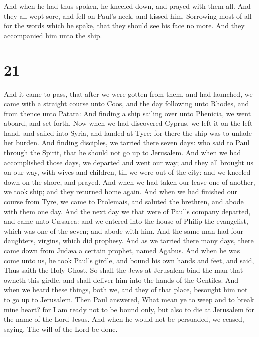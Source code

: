  And when he had thus spoken, he kneeled down, and prayed
with them all.  And they all wept sore, and fell on Paul's
neck, and kissed him,  Sorrowing most of all for the words
which he spake, that they should see his face no more. And they
accompanied him unto the ship.

\hypertarget{section-20}{%
\section{21}\label{section-20}}

 And it came to pass, that after we were gotten from them,
and had launched, we came with a straight course unto Coos, and the day
following unto Rhodes, and from thence unto Patara:  And
finding a ship sailing over unto Phenicia, we went aboard, and set
forth.  Now when we had discovered Cyprus, we left it on the
left hand, and sailed into Syria, and landed at Tyre: for there the ship
was to unlade her burden.  And finding disciples, we tarried
there seven days: who said to Paul through the Spirit, that he should
not go up to Jerusalem.  And when we had accomplished those
days, we departed and went our way; and they all brought us on our way,
with wives and children, till we were out of the city: and we kneeled
down on the shore, and prayed.  And when we had taken our
leave one of another, we took ship; and they returned home again.
 And when we had finished our course from Tyre, we came to
Ptolemais, and saluted the brethren, and abode with them one day.
 And the next day we that were of Paul's company departed,
and came unto Cæsarea: and we entered into the house of Philip the
evangelist, which was one of the seven; and abode with him. 
And the same man had four daughters, virgins, which did prophesy.
 And as we tarried there many days, there came down from
Judæa a certain prophet, named Agabus.  And when he was
come unto us, he took Paul's girdle, and bound his own hands and feet,
and said, Thus saith the Holy Ghost, So shall the Jews at Jerusalem bind
the man that owneth this girdle, and shall deliver him into the hands of
the Gentiles.  And when we heard these things, both we, and
they of that place, besought him not to go up to Jerusalem.
 Then Paul answered, What mean ye to weep and to break mine
heart? for I am ready not to be bound only, but also to die at Jerusalem
for the name of the Lord Jesus.  And when he would not be
persuaded, we ceased, saying, The will of the Lord be done.


